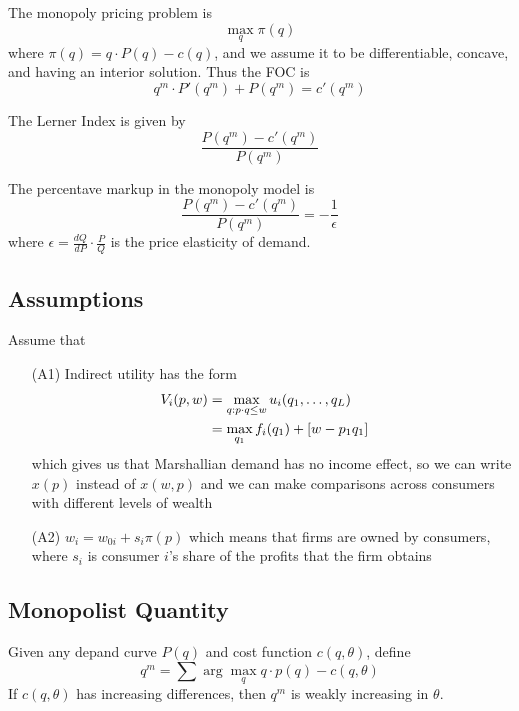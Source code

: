 





The monopoly pricing problem is
\[
\max_q \pi(q)
\]
where $\pi(q) = q \cdot P(q) - c(q)$, and we assume it to be
differentiable, concave, and having an interior solution. Thus the FOC
is
\[
q^m \cdot P'(q^m) + P(q^m) = c'(q^m)
\]

\begin{definition}
  The Lerner Index is given by
  \[
  \frac{P(q^m) - c'(q^m)}{P(q^m)}
  \]
\end{definition}

\begin{prop}
  The percentave markup in the monopoly model is
  \[
  \frac{P(q^m) - c'(q^m)}{P(q^m)} = - \frac{1}{\epsilon}
  \]
  where $\epsilon = \frac{dQ}{dP} \cdot \frac{P}{Q}$ is the price
  elasticity of demand.
\end{prop}


\subsection{Assumptions}
\label{sec:assumptions}

Assume that
\begin{itemize}
\item[(A1)] Indirect utility has the form
  \begin{align}
    V_i(p,w) & = \max_{q : p \cdot q \leq w} u_i(q_1, \dots, q_L) & \notag \\
    & = \max_{q_1} f_i(q_1) + [w - p_1 q_1] & \notag
  \end{align}
  which gives us that Marshallian demand has no income effect, so we
  can write $x(p)$ instead of $x(w,p)$ and we can make comparisons
  across consumers with different levels of wealth
\item[(A2)] $w_i = w_{0i} + s_i \pi(p)$ which means that firms are
  owned by consumers, where $s_i$ is consumer $i$'s share of the
  profits that the firm obtains
\end{itemize}

\subsection{Monopolist Quantity}
\label{sec:monopolist-quantity}



\begin{prop}
  Given any depand curve $P(q)$ and cost function $c(q, \theta)$, define
  \[
  q^m = \sum \arg \max_q q \cdot p(q) - c(q, \theta)
  \]
  If $c(q, \theta)$ has increasing differences, then $q^m$ is weakly
  increasing in $\theta$.
\end{prop}


